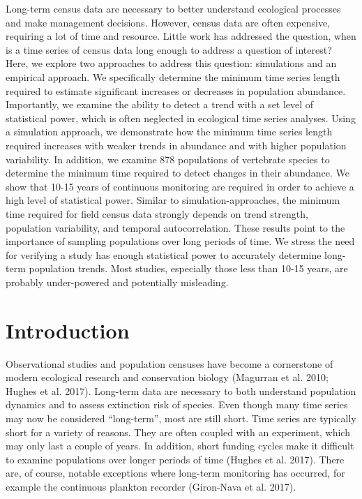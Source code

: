 \documentclass[12pt,]{article}
\begin{document}
Long-term census data are necessary to better understand ecological
processes and make management decisions. However, census data are often
expensive, requiring a lot of time and resource. Little work has
addressed the question, when is a time series of census data long enough
to address a question of interest? Here, we explore two approaches to
address this question: simulations and an empirical approach. We
specifically determine the minimum time series length required to
estimate significant increases or decreases in population abundance.
Importantly, we examine the ability to detect a trend with a set level
of statistical power, which is often neglected in ecological time series
analyses. Using a simulation approach, we demonstrate how the minimum
time series length required increases with weaker trends in abundance
and with higher population variability. In addition, we examine 878
populations of vertebrate species to determine the minimum time required
to detect changes in their abundance. We show that 10-15 years of
continuous monitoring are required in order to achieve a high level of
statistical power. Similar to simulation-approaches, the minimum time
required for field census data strongly depends on trend strength,
population variability, and temporal autocorrelation. These results
point to the importance of sampling populations over long periods of
time. We stress the need for verifying a study has enough statistical
power to accurately determine long-term population trends. Most studies,
especially those less than 10-15 years, are probably under-powered and
potentially misleading.

  \renewcommand{\thesection}{\arabic{section}}  

\section{Introduction}\label{introduction}

Observational studies and population censuses have become a cornerstone
of modern ecological research and conservation biology (Magurran et al.
2010; Hughes et al. 2017). Long-term data are necessary to both
understand population dynamics and to assess extinction risk of species.
Even though many time series may now be considered ``long-term'', most
are still short. Time series are typically short for a variety of
reasons. They are often coupled with an experiment, which may only last
a couple of years. In addition, short funding cycles make it difficult
to examine populations over longer periods of time (Hughes et al. 2017).
There are, of course, notable exceptions where long-term monitoring has
occurred, for example the continuous plankton recorder (Giron-Nava et
al. 2017).
\end{document}
